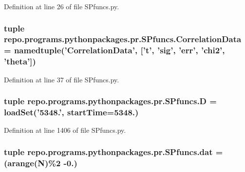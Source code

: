 Definition at line 26 of file S\-Pfuncs.\-py.

\hypertarget{namespacerepo_1_1programs_1_1pythonpackages_1_1pr_1_1SPfuncs_a97ee543cf8ac7b27443cbfe8ff2e20f3}{
\subsubsection[{Correlation\-Data}]{\setlength{\rightskip}{0pt plus 5cm}tuple repo.\-programs.\-pythonpackages.\-pr.\-S\-Pfuncs.\-Correlation\-Data = namedtuple('Correlation\-Data', \mbox{[}'{\bf t}', 'sig', 'err', 'chi2', 'theta'\mbox{]})}}\label{namespacerepo_1_1programs_1_1pythonpackages_1_1pr_1_1SPfuncs_a97ee543cf8ac7b27443cbfe8ff2e20f3}


Definition at line 37 of file S\-Pfuncs.\-py.

\hypertarget{namespacerepo_1_1programs_1_1pythonpackages_1_1pr_1_1SPfuncs_ae11ccbd488015737fccc78456a5a112f}{
\subsubsection[{D}]{\setlength{\rightskip}{0pt plus 5cm}tuple repo.\-programs.\-pythonpackages.\-pr.\-S\-Pfuncs.\-D = load\-Set('5348.', start\-Time=5348.)}}\label{namespacerepo_1_1programs_1_1pythonpackages_1_1pr_1_1SPfuncs_ae11ccbd488015737fccc78456a5a112f}


Definition at line 1406 of file S\-Pfuncs.\-py.

\hypertarget{namespacerepo_1_1programs_1_1pythonpackages_1_1pr_1_1SPfuncs_a68243cfba6d3074cf6381b76546eec71}{
\subsubsection[{dat}]{\setlength{\rightskip}{0pt plus 5cm}tuple repo.\-programs.\-pythonpackages.\-pr.\-S\-Pfuncs.\-dat = (arange({\bf N})\%2 -\/0.)}}\label{namespacerepo_1_1programs_1_1pythonpackages_1_1pr_1_1SPfuncs_a68243cfba6d3074cf6381b76546eec71}


